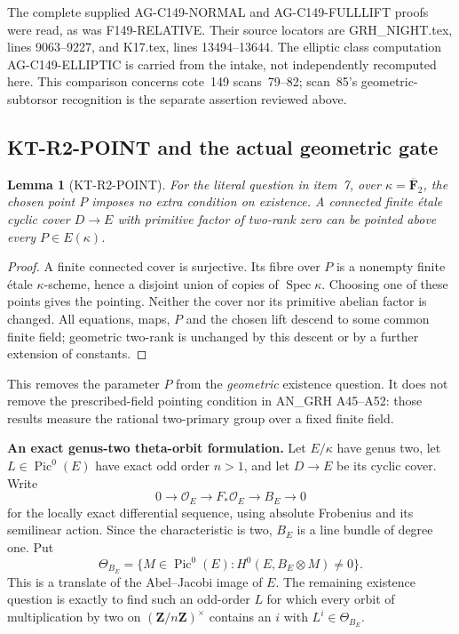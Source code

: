 \documentclass[11pt,a4paper]{article}
\newtheorem{lemma}[theorem]{Lemma}
\theoremstyle{definition}
\renewcommand{\paragraph}[1]{\par\smallskip\noindent\textbf{#1}\quad\ignorespaces}
\begin{document}
The complete supplied AG-C149-NORMAL and AG-C149-FULLLIFT
proofs were read, as was F149-RELATIVE. Their source
locators are GRH\_NIGHT.tex, lines 9063--9227, and
K17.tex, lines 13494--13644. The elliptic class computation
AG-C149-ELLIPTIC is carried from the intake, not
independently recomputed here. This comparison concerns
cote~149 scans~79--82; scan~85's geometric-subtorsor
recognition is the separate assertion reviewed above.




\subsection{KT-R2-POINT and the actual geometric gate}
\label{sec:kt-r2-point}

\begin{lemma}[KT-R2-POINT]
For the literal question in item~7, over
$\kappa=\overline{\mathbf F}_2$, the chosen point $P$ imposes
no extra condition on existence. A connected finite \'etale
cyclic cover $D\to E$ with primitive factor of two-rank zero
can be pointed above every $P\in E(\kappa)$.
\end{lemma}

\begin{proof}
A finite connected cover is surjective. Its fibre over $P$ is
a nonempty finite \'etale $\kappa$-scheme, hence a disjoint
union of copies of $\operatorname{Spec}\kappa$. Choosing one
of these points gives the pointing. Neither the cover nor its
primitive abelian factor is changed. All equations, maps,
$P$ and the chosen lift descend to some common finite field;
geometric two-rank is unchanged by this descent or by a
further extension of constants.
\end{proof}

This removes the parameter $P$ from the \emph{geometric}
existence question. It does not remove the prescribed-field
pointing condition in AN\_GRH A45--A52: those results measure
the rational two-primary group over a fixed finite field.

\paragraph{An exact genus-two theta-orbit formulation.}
Let $E/\kappa$ have genus two, let $L\in\operatorname{Pic}^0(E)$
have exact odd order $n>1$, and let $D\to E$ be its cyclic
cover. Write
\[
 0\longrightarrow\mathcal O_E\longrightarrow
 F_*\mathcal O_E\longrightarrow B_E\longrightarrow0
\]
for the locally exact differential sequence, using absolute
Frobenius and its semilinear action. Since the characteristic
is two, $B_E$ is a line bundle of degree one. Put
\[
 \Theta_{B_E}=\{M\in\operatorname{Pic}^0(E):
                         H^0(E,B_E\otimes M)\ne0\}.
                                                               \tag{R2.1}
\]
This is a translate of the Abel--Jacobi image of $E$.
The remaining existence question is exactly to find such
an odd-order $L$ for which every orbit of multiplication by
two on $(\mathbf Z/n\mathbf Z)^\times$ contains an $i$
with $L^i\in\Theta_{B_E}$.
\end{document}
